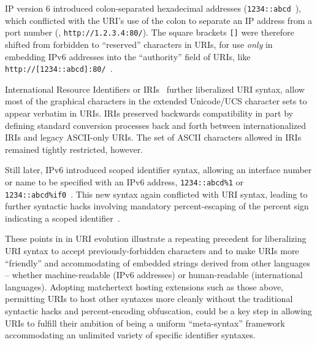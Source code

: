 IP version 6 introduced colon-separated hexadecimal addresses
(\eg \verb|1234::abcd|~\cite{rfc2373}),
which conflicted with the URI's use of the colon to separate
an IP address from a port number (\eg, \verb|http://1.2.3.4:80/|).
The square brackets \verb|[]| were therefore shifted
from forbidden to ``reserved'' characters in URIs,
for use \emph{only} in embedding IPv6 addresses
into the ``authority'' field of URIs,
like \verb|http://[1234::abcd]:80/|~\cite{rfc2732}.

International Resource Identifiers or IRIs~\cite{rfc3987}
further liberalized URI syntax,
allow most of the graphical characters
in the extended Unicode/UCS character sets to appear verbatim in URIs.
IRIs preserved backwards compatibility
in part by defining standard conversion processes back and forth
between internationalized IRIs and legacy ASCII-only URIs.
The set of ASCII characters allowed in IRIs remained tightly restricted,
however.

Still later, IPv6 introduced scoped identifier syntax,
allowing an interface number or name to be specified with an IPv6 address,
\eg \verb|1234::abcd%1| or \verb|1234::abcd%if0|~\cite{rfc4007}.
This new syntax again conflicted with URI syntax,
leading to further syntactic hacks involving
mandatory percent-escaping of the percent sign
indicating a scoped identifier~\cite{rfc6874}.

These points in in URI evolution illustrate
a repeating precedent for liberalizing URI syntax
to accept previously-forbidden characters
and to make URIs more ``friendly'' and accommodating
of embedded strings derived from other languages --
whether machine-readable (\eg IPv6 addresses)
or human-readable (international languages).
Adopting matchertext hosting extensions such as those above,
permitting URIs to host other syntaxes more cleanly
without the traditional  syntactic hacks and percent-encoding obfuscation,
could be a key step in allowing URIs to fulfill their ambition
of being a uniform ``meta-syntax'' framework
accommodating an unlimited variety of specific identifier syntaxes.


